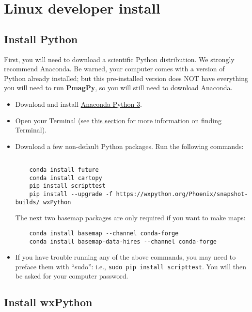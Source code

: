 \documentclass[11pt]{article}
\begin{document}
\tableofcontents

\section{Linux developer install}

\subsection{Install Python}

First, you will need to download a scientific Python distribution.  We strongly recommend Anaconda.  Be warned, your computer comes with a version of Python already installed; but this pre-installed version does NOT have everything you will need to run {\bf PmagPy}, so you will still need to download Anaconda.

\begin{itemize}
   \item Download and install \href{https://www.anaconda.com/download}{Anaconda Python 3}.
   \item Open your Terminal (see \href{https://earthref.org/PmagPy/cookbook/#command_line}{this section} for more information on finding Terminal).
   \item Download a few non-default Python packages.  Run the following commands: \begin{verbatim}

    conda install future
    conda install cartopy
    pip install scripttest
    pip install --upgrade -f https://wxpython.org/Phoenix/snapshot-builds/ wxPython
\end{verbatim}
     The next two basemap packages are only required if you want to make maps:
\begin{verbatim}
    conda install basemap --channel conda-forge
    conda install basemap-data-hires --channel conda-forge

\end{verbatim}

\item If you have trouble running any of the above commands, you may need to preface them with ``sudo'': i.e., \texttt{sudo pip install scripttest}.  You will then be asked for your computer password.

  \end{itemize}

\subsection{Install wxPython}
\end{document}
